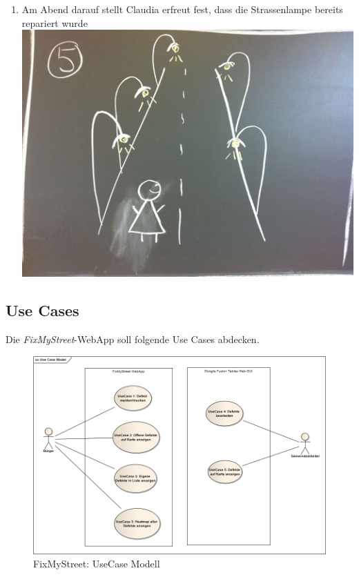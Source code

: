 \begin{enumerate}
\item Am Abend darauf stellt Claudia erfreut fest, dass die Strassenlampe bereits repariert wurde \\ \includegraphics[scale=0.4]{images/usecase2-fixmystreet/storyboard/fixmystreet-storyboard-5.jpg}
\end{enumerate}

\subsection{Use Cases}
Die \emph{FixMyStreet}-WebApp soll folgende Use Cases abdecken.

\begin{figure}[H]
	\centering
	\includegraphics[width=\textwidth]{images/usecase2-fixmystreet/uml/fixmystreet-usecasemodel}
	\caption{FixMyStreet: UseCase Modell}
	\label{fixmystreet-usecasemodel}
\end{figure}

